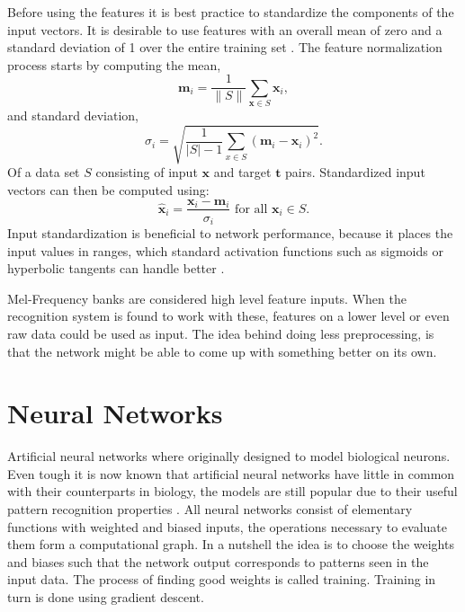 Before using the features it is best practice to standardize the components of the input vectors. It is desirable to use features with an overall mean of zero and a standard deviation of 1 over the entire training set \cite[page 30]{Graves2008}. The feature normalization process starts by computing the mean,
\begin{equation}
\mathbf{m}_i = \frac{1}{\|S\|} \sum\limits_{\mathbf{x} \in S} \mathbf{x}_i,
\end{equation}
and standard deviation,
\begin{equation}
\sigma_i = \sqrt{\frac{1}{|S| - 1}\sum\limits_{x \in S}(\mathbf{m}_i - \mathbf{x}_i)^2}.
\end{equation}
Of a data set $S$ consisting of input $\mathbf{x}$ and target $\mathbf{t}$ pairs. Standardized input vectors can then be computed using:
\begin{equation}
\hat{\mathbf{x}}_i = \frac{\mathbf{x}_i - \mathbf{m}_i}{\sigma_i} \text{  for all } \mathbf{x}_i \in S.
\end{equation}
Input standardization is beneficial to network performance, because it places the input values in ranges, which standard activation functions such as sigmoids or hyperbolic tangents can handle better \cite[page 30]{Graves2008}.

Mel-Frequency banks are considered high level feature inputs. When the recognition system is found to work with these, features on a lower level or even raw data could be used as input. The idea behind doing less preprocessing, is that the network might be able to come up with something better on its own.

\section{Neural Networks}
Artificial neural networks where originally designed to model biological neurons. Even tough it is now known that artificial neural networks have little in common with their counterparts in biology, the models are still popular due to their useful pattern recognition properties \cite[page 13]{Graves2008}. All neural networks consist of elementary functions with weighted and biased inputs, the operations necessary to evaluate them form a computational graph. In a nutshell the idea is to choose the weights and biases such that the network output corresponds to patterns seen in the input data. The process of finding good weights is called training. Training in turn is done using gradient descent.

